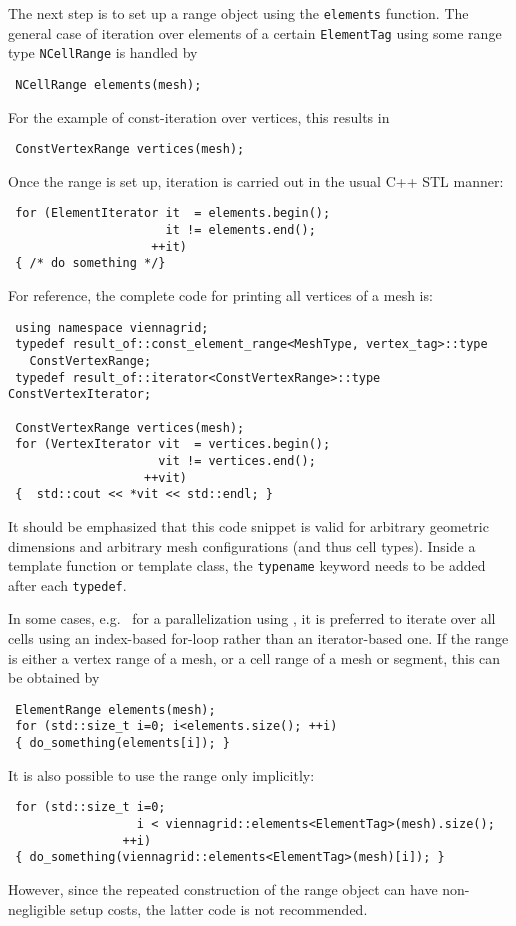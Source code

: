 The next step is to set up a range object using the \lstinline|elements| function.
The general case of iteration over elements of a certain \lstinline|ElementTag| using some range type \lstinline|NCellRange| is handled by
\begin{lstlisting}
 NCellRange elements(mesh);
\end{lstlisting}
For the example of const-iteration over vertices, this results in
\begin{lstlisting}
 ConstVertexRange vertices(mesh);
\end{lstlisting}

Once the range is set up, iteration is carried out in the usual C++ STL manner:
\begin{lstlisting}
 for (ElementIterator it  = elements.begin();
                      it != elements.end();
                    ++it)
 { /* do something */}
\end{lstlisting}
For reference, the complete code for printing all vertices of a mesh is:
\begin{lstlisting}
 using namespace viennagrid;
 typedef result_of::const_element_range<MeshType, vertex_tag>::type
   ConstVertexRange;
 typedef result_of::iterator<ConstVertexRange>::type ConstVertexIterator;

 ConstVertexRange vertices(mesh);
 for (VertexIterator vit  = vertices.begin();
                     vit != vertices.end();
                   ++vit)
 {  std::cout << *vit << std::endl; }
\end{lstlisting}
It should be emphasized that this code snippet is valid for arbitrary geometric dimensions and arbitrary mesh configurations (and thus cell types). Inside a template function or template class, the \lstinline|typename| keyword needs to be added after each \lstinline|typedef|.



In some cases, e.g.~ for a parallelization using \OpenMP \cite{openmp}, it is preferred to iterate over all cells using an index-based for-loop rather than an iterator-based one.
If the range is either a vertex range of a mesh, or a cell range of a mesh or segment, this can be obtained by
\begin{lstlisting}
 ElementRange elements(mesh);
 for (std::size_t i=0; i<elements.size(); ++i)
 { do_something(elements[i]); }
\end{lstlisting}
It is also possible to use the range only implicitly:
\begin{lstlisting}
 for (std::size_t i=0;
                  i < viennagrid::elements<ElementTag>(mesh).size();
                ++i)
 { do_something(viennagrid::elements<ElementTag>(mesh)[i]); }
\end{lstlisting}
However, since the repeated construction of the range object can have non-negligible setup costs, the latter code is not recommended.

